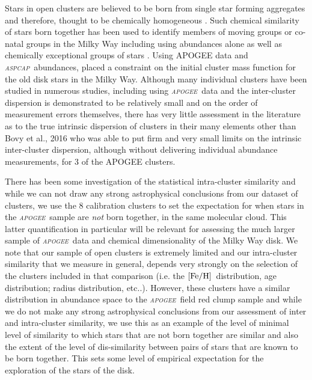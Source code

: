 \documentclass[14pt, preprint2]{aastex6}
\newcommand{\project}[1]{\textsl{#1}}
\newcommand{\apogee}{\project{\textsc{apogee}}}
\newcommand{\aspcap}{\project{\textsc{aspcap}}}
\newcommand{\feh}{\mbox{$\rm [Fe/H]$}}
\begin{document}
Stars in open clusters are believed to be born from single star forming aggregates and therefore, thought to be chemically homogeneous \citep[e.g.][]{deSilva2007,deSilva2009, Martell2016}. Such chemical similarity of stars born together has been used to identify members of moving groups or co-natal groups in the Milky Way including using abundances alone \citep[e.g.][]{Majewski2012a, Hogg2016} as well as chemically exceptional groups of stars \citep[e.g.][]{Schiavon2016, Martell2016}.  Using APOGEE data and \aspcap\ abundances, \citet{Ting2016} placed a constraint on the initial cluster mass function for the old disk stars in the Milky Way.  Although many individual clusters have been studied in numerous studies, including using \apogee\ data \citep[e.g.][]{Souto2016, Cuhna2015, F2013} and the inter-cluster dispersion is demonstrated to be relatively small and on the order of measurement errors themselves, there has very little assessment in the literature as to the true intrinsic dispersion of clusters in their many elements other than Bovy et al., 2016 who was able to put firm and very small limits on the intrinsic inter-cluster dispersion, although without delivering individual abundance measurements, for 3 of the APOGEE clusters. 

There has been some investigation of the statistical intra-cluster similarity \citep[][]{M2014, deSilva2015} and while we can not draw any strong astrophysical conclusions from our dataset of clusters, we use the 8 calibration clusters to set the expectation for when stars in the \apogee\ sample are \textit{not} born together, in the same molecular cloud. This latter quantification in particular will be relevant for assessing the much larger sample of \apogee\ data and chemical dimensionality of the Milky Way disk. We note that our sample of open clusters is extremely limited and our intra-cluster similarity that we measure in general, depends very strongly on  the selection of the clusters included in that comparison (i.e. the \feh\ distribution, age distribution; radius distribution, etc..). However, these clusters have a similar distribution in abundance space to the \apogee\ field red clump sample and while we do not make any strong astrophysical conclusions from our assessment of inter and intra-cluster similarity, we use this as an example of the level of minimal level of similarity to which stars that are not born together are similar and also the extent of the level of dis-similarity between pairs of stars that are known to be born together.  This sets some level of empirical expectation for the exploration of the stars of the disk. 
\end{document}
